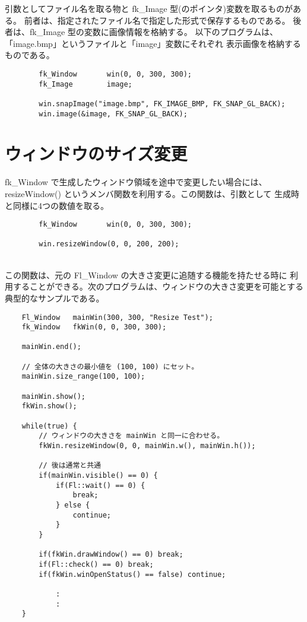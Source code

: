 引数としてファイル名を取る物と fk\_Image 型(のポインタ)変数を取るものがある。
前者は、指定されたファイル名で指定した形式で保存するものである。
後者は、fk\_Image 型の変数に画像情報を格納する。
以下のプログラムは、「image.bmp」というファイルと「image」変数にそれぞれ
表示画像を格納するものである。
\\
\begin{screen}
\begin{verbatim}
        fk_Window       win(0, 0, 300, 300);
        fk_Image        image;

        win.snapImage("image.bmp", FK_IMAGE_BMP, FK_SNAP_GL_BACK);
        win.image(&image, FK_SNAP_GL_BACK);
\end{verbatim}
\end{screen}

\section{ウィンドウのサイズ変更}
fk\_Window で生成したウィンドウ領域を途中で変更したい場合には、
resizeWindow() というメンバ関数を利用する。この関数は、引数として
生成時と同様に4つの数値を取る。
\\
\begin{screen}
\begin{verbatim}
        fk_Window       win(0, 0, 300, 300);

        win.resizeWindow(0, 0, 200, 200);
\end{verbatim}
\end{screen}
~ \\
この関数は、元の Fl\_Window の大きさ変更に追随する機能を持たせる時に
利用することができる。次のプログラムは、ウィンドウの大きさ変更を可能とする
典型的なサンプルである。
\\
\begin{breakbox}
\begin{verbatim}
    Fl_Window   mainWin(300, 300, "Resize Test");
    fk_Window   fkWin(0, 0, 300, 300);

    mainWin.end();

    // 全体の大きさの最小値を (100, 100) にセット。
    mainWin.size_range(100, 100);

    mainWin.show();
    fkWin.show();

    while(true) {
        // ウィンドウの大きさを mainWin と同一に合わせる。        
        fkWin.resizeWindow(0, 0, mainWin.w(), mainWin.h());

        // 後は通常と共通
        if(mainWin.visible() == 0) {
            if(Fl::wait() == 0) {
                break;
            } else {
                continue;
            }
        }

        if(fkWin.drawWindow() == 0) break;
        if(Fl::check() == 0) break;
        if(fkWin.winOpenStatus() == false) continue;

            :
            :
    }
\end{verbatim}
\end{breakbox}
